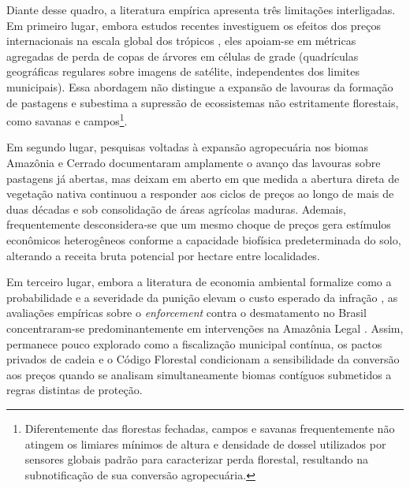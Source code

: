 Diante desse quadro, a literatura empírica apresenta três limitações interligadas. Em primeiro lugar, embora estudos recentes investiguem os efeitos dos preços internacionais na escala global dos trópicos \cite{BermanEtAl2023}, eles apoiam-se em métricas agregadas de perda de copas de árvores em células de grade (quadrículas geográficas regulares sobre imagens de satélite, independentes dos limites municipais). Essa abordagem não distingue a expansão de lavouras da formação de pastagens e subestima a supressão de ecossistemas não estritamente florestais, como savanas e campos\footnote{Diferentemente das florestas fechadas, campos e savanas frequentemente não atingem os limiares mínimos de altura e densidade de dossel utilizados por sensores globais padrão para caracterizar perda florestal, resultando na subnotificação de sua conversão agropecuária.}.

Em segundo lugar, pesquisas voltadas à expansão agropecuária nos biomas Amazônia e Cerrado \cite{MacedoEtAl2012, Spera2017, Braganca2018, SimoesEtAl2020} documentaram amplamente o avanço das lavouras sobre pastagens já abertas, mas deixam em aberto em que medida a abertura direta de vegetação nativa continuou a responder aos ciclos de preços ao longo de mais de duas décadas e sob consolidação de áreas agrícolas maduras. Ademais, frequentemente desconsidera-se que um mesmo choque de preços gera estímulos econômicos heterogêneos conforme a capacidade biofísica predeterminada do solo, alterando a receita bruta potencial por hectare entre localidades.

Em terceiro lugar, embora a literatura de economia ambiental formalize como a probabilidade e a severidade da punição elevam o custo esperado da infração \cite{Shimshack2014}, as avaliações empíricas sobre o \textit{enforcement} contra o desmatamento no Brasil concentraram-se predominantemente em intervenções na Amazônia Legal \cite{AssuncaoEtAl2015, AssuncaoEtAl2023, HardingEtAl2021, HeilmayrEtAl2020}. Assim, permanece pouco explorado como a fiscalização municipal contínua, os pactos privados de cadeia e o Código Florestal condicionam a sensibilidade da conversão aos preços quando se analisam simultaneamente biomas contíguos submetidos a regras distintas de proteção.


